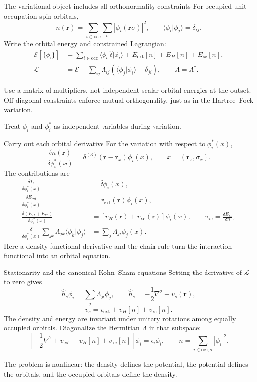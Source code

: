 \documentclass[aspectratio=169,10pt]{beamer}
\newcommand{\mbbox}[1]{\begin{tcolorbox}[colback=paleblue,colframe=uioblue,title={Many-body connection}]#1\end{tcolorbox}}
\newcommand{\dftbox}[1]{\begin{tcolorbox}[colback=paleteal,colframe=teal,title={Key result}]#1\end{tcolorbox}}
\newcommand{\rr}{\mathbf r}
\newcommand{\ket}[1]{\lvert #1\rangle}
\newcommand{\bra}[1]{\langle #1\rvert}
\newcommand{\avg}[1]{\langle #1\rangle}
\newcommand{\ext}{\mathrm{ext}}
\newcommand{\occ}{\mathrm{occ}}
\newcommand{\xc}{\mathrm{xc}}
\begin{document}
\begin{frame}{The variational object includes all orthonormality constraints}
For occupied unit-occupation spin orbitals,
\[
 n(\rr)=\sum_{i\in\occ}\sum_\sigma|\phi_i(\rr\sigma)|^2,
 \qquad \avg{\phi_i|\phi_j}=\delta_{ij}.
\]
Write the orbital energy and constrained Lagrangian:
\begin{align*}
 \mathcal E[\{\phi_i\}]&=\sum_{i\in\occ}\bra{\phi_i}\hat t\ket{\phi_i}
       +E_{\ext}[n]+E_H[n]+E_{\xc}[n],\\
 \mathcal L&=\mathcal E-\sum_{ij}\Lambda_{ij}
          (\avg{\phi_j|\phi_i}-\delta_{ji}),\qquad \Lambda=\Lambda^\dagger.
\end{align*}
\mbbox{Use a matrix of multipliers, not independent scalar orbital energies
at the outset. Off-diagonal constraints enforce mutual orthogonality,
just as in the Hartree--Fock variation.}
Treat $\phi_i$ and $\phi_i^*$ as independent variables during variation.
\end{frame}

\begin{frame}{Carry out each orbital derivative}
For the variation with respect to $\phi_i^*(x)$,
\[
 \frac{\delta n(\rr)}{\delta\phi_i^*(x)}
 =\delta^{(3)}(\rr-\mathbf r_x)\phi_i(x),\qquad x=(\mathbf r_x,\sigma_x).
\]
The contributions are
\begin{align*}
 \frac{\delta T_s}{\delta\phi_i^*(x)}&=\hat t\phi_i(x),\\
 \frac{\delta E_{\ext}}{\delta\phi_i^*(x)}&=v_{\ext}(\rr)\phi_i(x),\\
 \frac{\delta(E_H+E_{\xc})}{\delta\phi_i^*(x)}
       &=[v_H(\rr)+v_{\xc}(\rr)]\phi_i(x),
 \qquad v_{\xc}=\frac{\delta E_{\xc}}{\delta n},\\
 \frac{\delta}{\delta\phi_i^*(x)}\sum_{jk}\Lambda_{jk}\avg{\phi_k|\phi_j}
       &=\sum_j\Lambda_{ji}\phi_j(x).
\end{align*}
Here a density-functional derivative and the chain rule turn the interaction
functional into an orbital equation.
\end{frame}

\begin{frame}{Stationarity and the canonical Kohn--Sham equations}
Setting the derivative of $\mathcal L$ to zero gives
\[
 \hat h_s\phi_i=\sum_j\Lambda_{ji}\phi_j,\qquad
 \hat h_s=-\frac12\nabla^2+v_s(\rr),
\]
\[
 v_s=v_{\ext}+v_H[n]+v_{\xc}[n].
\]
The density and energy are invariant under unitary rotations among equally
occupied orbitals. Diagonalize the Hermitian $\Lambda$ in that subspace:
\[
 \boxed{\left[-\frac12\nabla^2+v_{\ext}+v_H[n]+v_{\xc}[n]\right]\phi_i
          =\epsilon_i\phi_i,\qquad n=\sum_{i\in\occ,\sigma}|\phi_i|^2.}
\]
\dftbox{The problem is nonlinear: the density defines the potential, the
potential defines the orbitals, and the occupied orbitals define the density.}
\end{frame}
\end{document}
